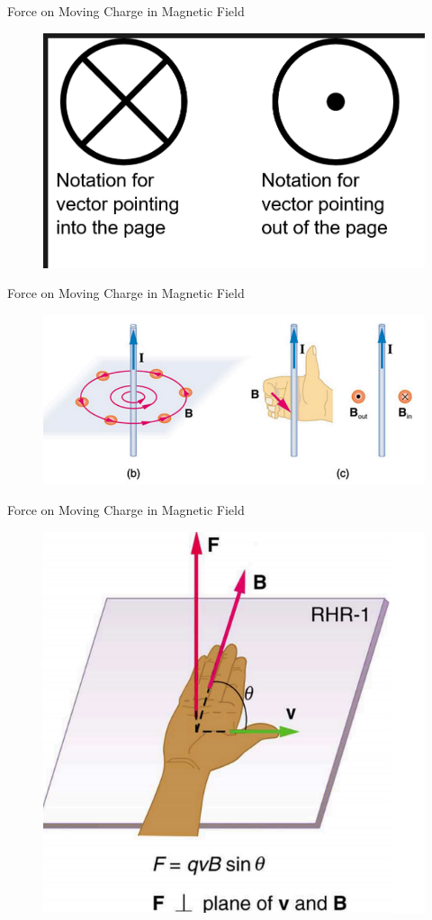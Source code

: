 \documentclass{beamer}
\begin{document}
\begin{frame}{Force on Moving Charge in Magnetic Field}
\begin{figure}
    \centering
    \includegraphics[width=0.75\linewidth]{phys12-vectors-vector-addition.png}
\end{figure}

\end{frame}

\begin{frame}{Force on Moving Charge in Magnetic Field}
\begin{figure}
\centering
\includegraphics[width=0.75\linewidth]{phys12-magnetism-right-hand-rule-force.png}
\end{figure}
\end{frame}



\begin{frame}{Force on Moving Charge in Magnetic Field}
\begin{figure}
\centering
\includegraphics[width=0.8\linewidth]{phys12-magnetism-right-hand-rule-current.png}
\end{figure}
\end{frame}
\end{document}
